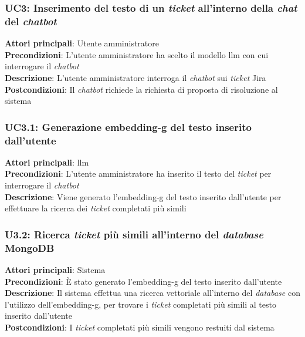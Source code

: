 \subsubsection{UC3: Inserimento del testo di un \textit{ticket} all'interno della \textit{chat} del \textit{chatbot}}
\textbf{Attori principali}: Utente amministratore \\
\textbf{Precondizioni}: L'utente amministratore ha scelto il modello \gls{llm} con cui interrogare il \textit{chatbot} \\
\textbf{Descrizione}: L'utente amministratore interroga il \textit{chatbot} sui \textit{ticket} Jira \\
\textbf{Postcondizioni}: Il \textit{chatbot} richiede la richiesta di proposta di risoluzione al sistema \\

\subsubsection{UC3.1: Generazione \gls{embedding-g} del testo inserito dall'utente}
\textbf{Attori principali}: \gls{llm} \\
\textbf{Precondizioni}: L'utente amministratore ha inserito il testo del \textit{ticket} per interrogare il \textit{chatbot} \\
\textbf{Descrizione}: Viene generato l'\gls{embedding-g} del testo inserito dall'utente per effettuare la ricerca dei \textit{ticket} completati più simili \\

\subsubsection{U3.2: Ricerca \textit{ticket} più simili all'interno del \textit{database} MongoDB}
\textbf{Attori principali}: Sistema \\
\textbf{Precondizioni}: È stato generato l'\gls{embedding-g} del testo inserito dall'utente \\
\textbf{Descrizione}: Il sistema effettua una ricerca vettoriale all'interno del \textit{database} con l'utilizzo dell'\gls{embedding-g}, per trovare i \textit{ticket} completati più simili al testo inserito dall'utente \\
\textbf{Postcondizioni}: I \textit{ticket} completati più simili vengono restuiti dal sistema \\

